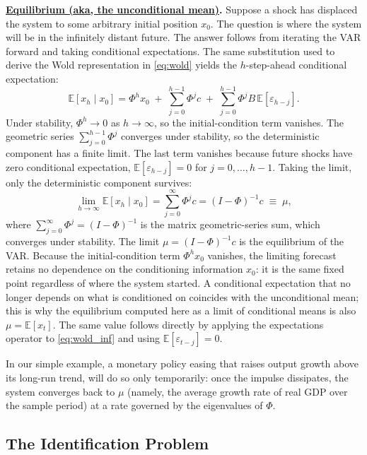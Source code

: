 \documentclass[12pt]{article}
\begin{document}
\noindent \textbf{\sffamily\underline{Equilibrium (aka, the unconditional mean)}.} Suppose a shock has displaced the system to some arbitrary initial position $x_0$. The question is where the system will be in the infinitely distant future. The answer follows from iterating the VAR forward and taking conditional expectations. The same substitution used to derive the Wold representation in \eqref{eq:wold} yields the $h$-step-ahead conditional expectation:
\begin{equation}\label{eq:hstep}
	\mathbb{E}\!\left[x_{h}\mid x_0\right]
	=\Phi^{h}x_{0}
	\;+\;\sum_{j=0}^{h-1}\Phi^{j}c
	\;+\;\sum_{j=0}^{h-1}\Phi^{j}B\,\mathbb{E}[\varepsilon_{h-j}].
\end{equation}
Under stability, $\Phi^{h}\to 0$ as $h\to\infty$, so the initial-condition term vanishes. The geometric series $\sum_{j=0}^{h-1}\Phi^{j}$ converges under stability, so the deterministic component has a finite limit. The last term vanishes because future shocks have zero conditional expectation, $\mathbb{E}[\varepsilon_{h-j}]=0$ for $j=0,\ldots,h-1$. Taking the limit, only the deterministic component survives:
\begin{equation}\label{eq:mu}
	\lim_{h\to\infty}\mathbb{E}\!\left[x_{h}\mid x_0\right]
	=\sum_{j=0}^{\infty}\Phi^{j}c
	=(I-\Phi)^{-1}c
	\;\equiv\;\mu,
\end{equation}
where $\sum_{j=0}^{\infty}\Phi^{j}=(I-\Phi)^{-1}$ is the matrix geometric-series sum, which converges under stability. The limit $\mu=(I-\Phi)^{-1}c$ is the equilibrium of the VAR. Because the initial-condition term $\Phi^{h}x_0$ vanishes, the limiting forecast retains no dependence on the conditioning information $x_0$: it is the same fixed point regardless of where the system started. A conditional expectation that no longer depends on what is conditioned on coincides with the unconditional mean; this is why the equilibrium computed here as a limit of conditional means is also $\mu=\mathbb{E}[x_t]$. The same value follows directly by applying the expectations operator to \eqref{eq:wold_inf} and using $\mathbb{E}[\varepsilon_{t-j}]=0$.

In our simple example, a monetary policy easing that raises output growth above its long-run trend, will do so only temporarily: once the impulse dissipates, the system converges back to $\mu$ (namely, the average growth rate of real GDP over the sample period) at a rate governed by the eigenvalues of $\Phi$.

\subsection{The Identification Problem}\label{sec:identproblem}
\end{document}
